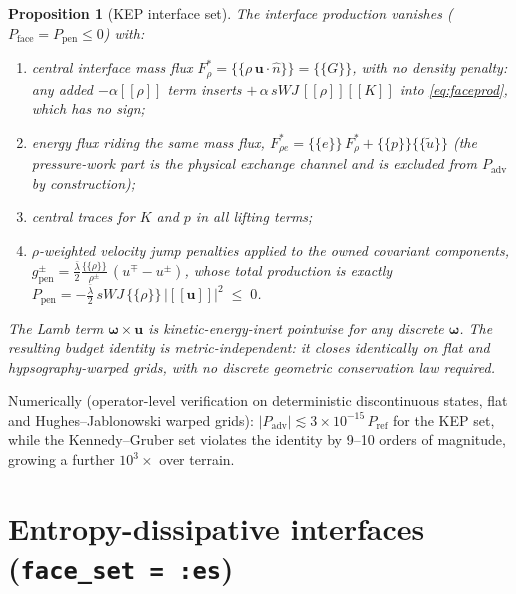 \documentclass[11pt]{article}
\newcommand{\uu}{\boldsymbol{u}}
\newcommand{\om}{\boldsymbol{\omega}}
\newcommand{\jump}[1]{[\![#1]\!]}
\newcommand{\avg}[1]{\{\!\!\{#1\}\!\!\}}
\newtheorem{prop}{Proposition}
\begin{document}
\begin{prop}[KEP interface set]
The interface production vanishes ($P_{\mathrm{face}} =
P_{\mathrm{pen}} \le 0$) with:
\begin{enumerate}
\item central interface mass flux $F^*_\rho = \avg{\rho\,\uu\cdot\hat n}
 = \avg{G}$, with \emph{no density penalty}: any added
 $-\alpha\jump{\rho}$ term inserts
 $+\,\alpha\,s\!W\!J\,\jump{\rho}\jump{K}$ into \eqref{eq:faceprod},
 which has no sign;
\item energy flux riding the same mass flux,
 $F^*_{\rho e} = \avg{e}\,F^*_\rho + \avg{p}\avg{\tilde u}$
 (the pressure-work part is the physical exchange channel and is
 excluded from $P_{\mathrm{adv}}$ by construction);
\item central traces for $K$ and $p$ in all lifting terms;
\item $\rho$-weighted velocity jump penalties applied to the owned
 covariant components,
 $g_{\mathrm{pen}}^\pm = \frac{\bar\lambda}{2}
 \frac{\avg{\rho}}{\rho^\pm}\,( u^\mp - u^\pm)$,
 whose total production is exactly
 $P_{\mathrm{pen}} = -\tfrac{\bar\lambda}{2}\, s\!W\!J\,
 \avg{\rho}\,\big|\jump{\uu}\big|^2 \;\le\; 0$.
\end{enumerate}
The Lamb term $\om\times\uu$ is kinetic-energy-inert pointwise for any
discrete $\om$. The resulting budget identity is metric-independent: it
closes identically on flat and hypsography-warped grids, with no discrete
geometric conservation law required.
\end{prop}

Numerically (operator-level verification on deterministic discontinuous
states, flat and Hughes--Jablonowski warped grids):
$|P_{\mathrm{adv}}| \lesssim 3\times10^{-15}\,P_{\mathrm{ref}}$ for the
KEP set, while the Kennedy--Gruber set violates the identity by 9--10
orders of magnitude, growing a further $10^3\times$ over terrain.

\section{Entropy-dissipative interfaces (\texttt{face\_set = :es})}
\label{sec:es}
\end{document}
